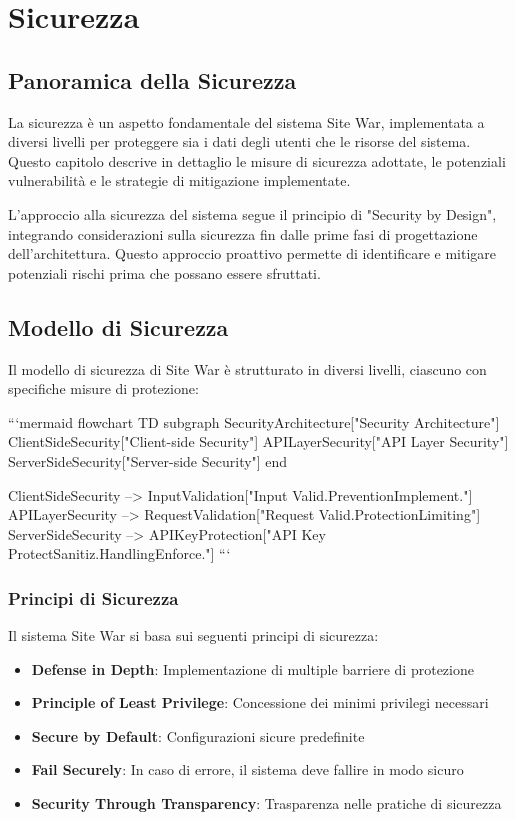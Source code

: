 \chapter{Sicurezza}

\section{Panoramica della Sicurezza}
La sicurezza è un aspetto fondamentale del sistema Site War, implementata a diversi livelli per proteggere sia i dati degli utenti che le risorse del sistema. Questo capitolo descrive in dettaglio le misure di sicurezza adottate, le potenziali vulnerabilità e le strategie di mitigazione implementate.

L'approccio alla sicurezza del sistema segue il principio di "Security by Design", integrando considerazioni sulla sicurezza fin dalle prime fasi di progettazione dell'architettura. Questo approccio proattivo permette di identificare e mitigare potenziali rischi prima che possano essere sfruttati.

\section{Modello di Sicurezza}
Il modello di sicurezza di Site War è strutturato in diversi livelli, ciascuno con specifiche misure di protezione:

```mermaid
flowchart TD
    subgraph SecurityArchitecture["Security Architecture"]
        ClientSideSecurity["Client-side Security"]
        APILayerSecurity["API Layer Security"]
        ServerSideSecurity["Server-side Security"]
    end
    
    ClientSideSecurity --> InputValidation["Input Valid.\nXSS Prevention\nCSP Implement.\nObfuscation"]
    APILayerSecurity --> RequestValidation["Request Valid.\nCSRF Protection\nRate Limiting\nAuthentication"]
    ServerSideSecurity --> APIKeyProtection["API Key Protect\nInput Sanitiz.\nError Handling\nHTTPS Enforce."]
```

\subsection{Principi di Sicurezza}
Il sistema Site War si basa sui seguenti principi di sicurezza:

\begin{itemize}
    \item \textbf{Defense in Depth}: Implementazione di multiple barriere di protezione
    \item \textbf{Principle of Least Privilege}: Concessione dei minimi privilegi necessari
    \item \textbf{Secure by Default}: Configurazioni sicure predefinite
    \item \textbf{Fail Securely}: In caso di errore, il sistema deve fallire in modo sicuro
    \item \textbf{Security Through Transparency}: Trasparenza nelle pratiche di sicurezza
\end{itemize}

